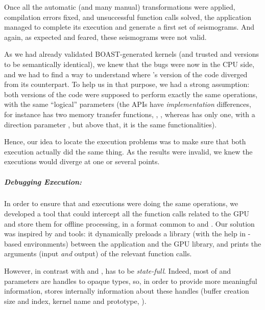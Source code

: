 Once all the automatic (and many manual) transformations were applied,
compilation errors fixed, and \OCL unsuccessful function calls solved,
the application managed to complete its execution and generate a first
set of seismograms. And again, as expected and feared, these
seismograms were not valid.

As we had already validated BOAST-generated kernels (and trusted \Cuda
and \OCL versions to be semantically identical), we knew that the bugs
were now in the CPU side, and we had to find a way to understand where
\Specfem's \Cuda version of the code diverged from its \OCL
counterpart. To help us in that purpose, we had a strong assumption:
both versions of the code were supposed to perform exactly the same
operations, with the same ``logical'' parameters (the APIs have
\emph{implementation} differences, for instance \OCL has two memory
transfer functions, ,
, whereas \Cuda has only one, with a
direction parameter , but above that, it is
the same functionalities).

Hence, our idea to locate the execution problems was to make sure that
both execution actually did the same thing. As the \OCL results were
invalid, we knew the executions would diverge at one or several
points.

\subparagraph{Debugging \OCL Execution: } In order to
ensure that \Cuda and \OCL executions were doing the same operations,
we developed a tool that could intercept all the function calls
related to the GPU and store them for offline processing, in a format
common to \OCL and \Cuda. Our solution was inspired by 
and  tools: it dynamically preloads a library (with the
help  in -based environments)
between the application and the GPU library, and prints the arguments
(input \emph{and} output) of the relevant function calls.

However, in contrast with  and ,
 has to be \emph{state-full}. Indeed, most of \OCL and
\Cuda parameters are handles to opaque types, so, in order to provide
more meaningful information,  stores internally
information about these handles (buffer creation size and index,
kernel name and prototype, \etc{}). %

